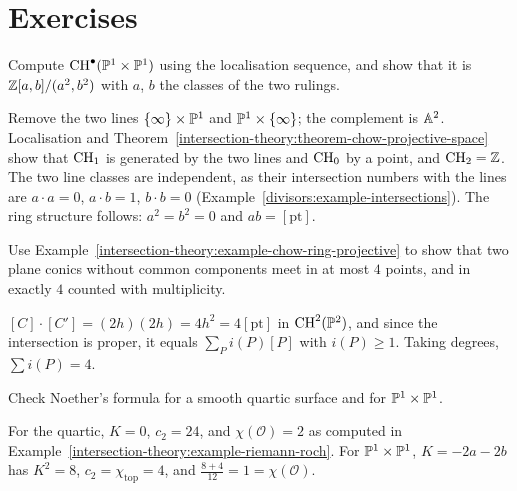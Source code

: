 \section{Exercises}\label{intersection-theory:section-exercises}

\begin{exercise}\label{intersection-theory:exercise-chow-quadric}
Compute $\operatorname{CH}^\bullet(\mathbb{P}^1 \times \mathbb{P}^1)$ using the localisation sequence, and show that it is $\mathbb{Z}[a, b]/(a^2, b^2)$ with $a$, $b$ the classes of the two rulings.
\end{exercise}

\begin{solution}
Remove the two lines $\{\infty\} \times \mathbb{P}^1$ and $\mathbb{P}^1 \times \{\infty\}$; the complement is $\mathbb{A}^2$. Localisation and Theorem~\ref{intersection-theory:theorem-chow-projective-space}
show that $\operatorname{CH}_1$ is generated by the two lines and $\operatorname{CH}_0$ by a point, and $\operatorname{CH}_2 = \mathbb{Z}$. The two line classes are independent, as their intersection numbers with the lines are
$a \cdot a = 0$, $a \cdot b = 1$, $b \cdot b = 0$ (Example~\ref{divisors:example-intersections}). The ring structure follows: $a^2 = b^2 = 0$ and $ab = [\mathrm{pt}]$.
\end{solution}

\begin{exercise}\label{intersection-theory:exercise-bezout-conics}
Use Example~\ref{intersection-theory:example-chow-ring-projective} to show that two plane conics without common components meet in at most $4$ points, and in exactly $4$ counted with
multiplicity.
\end{exercise}

\begin{solution}
$[C] \cdot [C'] = (2h)(2h) = 4h^2 = 4[\mathrm{pt}]$ in $\operatorname{CH}^2(\mathbb{P}^2)$, and since the intersection is proper, it equals $\sum_Pi(P)[P]$ with $i(P) \geq 1$. Taking degrees, $\sum i(P) = 4$.
\end{solution}

\begin{exercise}\label{intersection-theory:exercise-noether-quartic}
Check Noether's formula for a smooth quartic surface and for $\mathbb{P}^1 \times \mathbb{P}^1$.
\end{exercise}

\begin{solution}
For the quartic, $K = 0$, $c_2 = 24$, and $\chi(\mathcal{O}) = 2$ as computed in Example~\ref{intersection-theory:example-riemann-roch}. For $\mathbb{P}^1 \times \mathbb{P}^1$, $K = -2a - 2b$ has
$K^2 = 8$, $c_2 = \chi_{\mathrm{top}} = 4$, and $\frac{8 + 4}{12} = 1 = \chi(\mathcal{O})$.
\end{solution}
